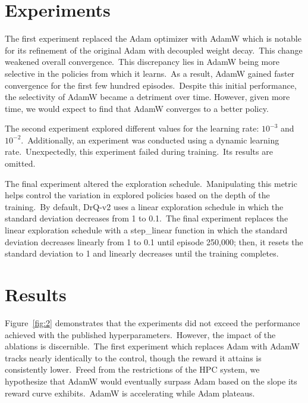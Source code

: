 \documentclass[conference]{./IEEEtran/IEEEtran} %
\begin{document}

    \section{Experiments}\label{sec:experiments}
    The first experiment replaced the Adam optimizer with AdamW which is notable for its refinement of the original Adam
    with decoupled weight decay.\ This change weakened overall convergence.\ This discrepancy lies in AdamW being more
    selective in the policies from which it learns.\ As a result, AdamW gained faster convergence for the first few
    hundred episodes.\ Despite this initial performance, the selectivity of AdamW became a detriment over time.
    However, given more time, we would expect to find that AdamW converges to a better policy.

    The second experiment explored different values for the learning rate: $10^{-3}$ and $10^{-2}$.\ Additionally, an
    experiment was conducted using a dynamic learning rate.\ Unexpectedly, this experiment failed during training.\ Its
    results are omitted.
    
    The final experiment altered the exploration schedule.\ Manipulating this metric helps control the variation in
    explored policies based on the depth of the training.\ By default, DrQ-v2 uses a linear exploration schedule in
    which the standard deviation decreases from 1 to 0.1.\ The final experiment replaces the linear exploration schedule
    with a step\_linear function in which the standard deviation decreases linearly from 1 to 0.1 until episode 250,000;
    then, it resets the standard deviation to 1 and linearly decreases until the training completes.
    
    \section{Results}\label{sec:results}
    Figure~\ref{fig:2} demonstrates that the experiments did not exceed the performance achieved with the published
    hyperparameters.\ However, the impact of the ablations is discernible.\ The first experiment which replaces Adam
    with AdamW tracks nearly identically to the control, though the reward it attains is consistently lower.\ Freed from
    the restrictions of the HPC system, we hypothesize that AdamW would eventually surpass Adam based on the slope its
    reward curve exhibits.\ AdamW is accelerating while Adam plateaus.
\end{document}
